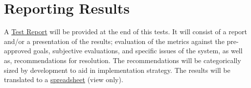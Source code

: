 \section{Reporting Results}

A \hyperlink{https://github.com/MIMBCD-UI/research-reports}{Test Report} will be provided at the end of this tests. It will consist of a report and/or a presentation of the results; evaluation of the metrics against the pre-approved goals, subjective evaluations, and specific issues of the system, as well as, recommendations for resolution. The recommendations will be categorically sized by development to aid in implementation strategy. The results will be translated to a \hyperlink{https://docs.google.com/spreadsheets/d/1CoPLONnINdBWryGs7SBRuPZA-DnQ0t_yzx3u8ym0UoI/edit?usp=sharing}{spreadsheet} (view only).